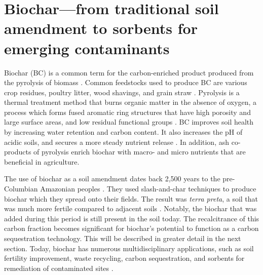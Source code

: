 \section{Biochar---from traditional soil amendment to sorbents for emerging contaminants}
Biochar (BC) is a common term for the carbon-enriched product produced from the pyrolysis of biomass \citep{LehmannAndJoseph2015}. Common feedstocks used to produce BC are various crop residues, poultry litter, wood shavings, and grain straw \citep{Ahmad2014}. Pyrolysis is a thermal treatment method that burns organic matter in the absence of oxygen, a process which forms fused aromatic ring structures that have high porosity and large surface areas, and low residual functional groups \citep{LehmannAndJoseph2015}. BC improves soil health by increasing water retention and carbon content. It also increases the pH of acidic soils, and secures a more steady nutrient release \citep{das2020application}. In addition, ash co-products of pyrolysis enrich biochar with macro- and micro nutrients that are beneficial in agriculture. 

The use of biochar as a soil amendment dates back 2,500 years to the pre-Columbian Amazonian peoples \citep{Tindall2017}. They used slash-and-char techniques to produce biochar which they spread onto their fields. The result was \textit{terra preta}, a soil that was much more fertile compared to adjacent soils \citep{Ahmad2014}. Notably, the biochar that was added during this period is still present in the soil today. The recalcitrance of this carbon fraction becomes significant for biochar's potential to function as a carbon sequestration technology. This will be described in greater detail in the next section. Today, biochar has numerous multidisciplinary applications, such as soil fertility improvement, waste recycling, carbon sequestration, and sorbents for remediation of contaminated sites \citep{beesley2011review}.

